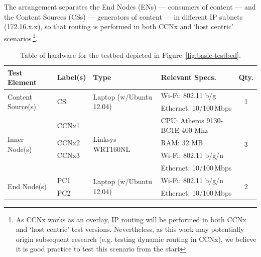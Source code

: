 The arrangement 
separates the End Nodes (ENs) --- consumers of content --- and the Content 
Sources (CSs) --- generators of content --- in different 
IP subnets (172.16.x.x), so that routing is performed in both CCNx and `host centric' 
scenarios\,\footnote{As CCNx works as an overlay, IP routing will be performed 
in both CCNx and `host centric' test versions. Nevertheless, as this work may 
potentially origin subsequent research (e.g. testing dynamic routing in CCNx), 
we believe it is good practice to test this scenario from the start}.\vertbreak

\begin{table}[h!]
    \centering
    \footnotesize
        \begin{tabularx}{1.00\textwidth}{ l l X X c }
            \toprule
            \textbf{Test Element} & \textbf{Label(s)} & \textbf{Type} & \textbf{Relevant Specs.}  & \textbf{Qty.} \\ [0.5ex]
            \midrule
            \multirow{2}{*}{Content Source(s)} & \multirow{2}{*}{CS} & \multirow{2}{*}{Laptop (w\slash Ubuntu 12.04)} & Wi-Fi: 802.11 b/g & \multirow{2}{*}{1} \\ [0.5ex]
                                               & & & Ethernet: 10\slash 100\,Mbps & \\ [0.5ex]
\midrule
            \multirow{4}{*}{Inner Node(s)}  & CCNx1 & \multirow{4}{*}{Linksys WRT160NL~\cite{website:wrt160nl}} & CPU: Atheros 9130-BC1E 400 Mhz    & \multirow{4}{*}{3} \\ [0.5ex]
                                            & CCNx2 &              	& RAM: 32 MB                        & \\ [0.5ex]
                                            & CCNx3 &               & Wi-Fi: 802.11 b/g/n               & \\ [0.5ex]
                                            & &                     & Ethernet: 10\slash 100\,Mbps      & \\ [0.5ex]
            \midrule
            \multirow{2}{*}{End Node(s)}    & PC1   & \multirow{2}{*}{Laptop (w\slash Ubuntu 12.04)}    & Wi-Fi: 802.11 b/g/n & \multirow{2}{*}{2} \\ [0.5ex]
                                            & PC2   &                                                   & Ethernet: 10\slash 100\,Mbps      & \\ [0.5ex]
            \bottomrule
        \end{tabularx}
    \caption{Table of hardware for the testbed depicted in Figure~\ref{fig:basic-testbed}.}
    \label{tab:hw}
\end{table}

